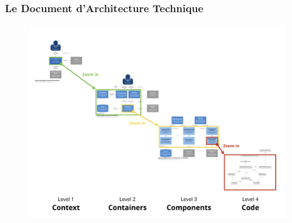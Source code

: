 \begin{frame}
    \frametitle{Le Document d'Architecture Technique}

    \begin{figure}
        \centering
        \includegraphics[height=0.5\linewidth]{figures/introduction/c4-overview}
        \label{fig:dat}
    \end{figure}
\end{frame}


